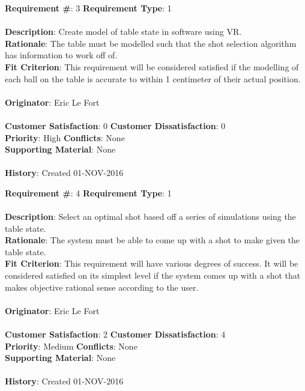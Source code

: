 \documentclass[titlepage]{article}
\begin{document}
\begin{framed}
	\noindent\textbf{Requirement \#}: 3 \hfill \textbf{Requirement Type}: 1 \hfill\\\\
	\noindent\textbf{Description}: Create model of table state in software using VR.\\
	\textbf{Rationale}: The table must be modelled such that the shot selection algorithm has information to work off of.\\
	\textbf{Fit Criterion}: This requirement will be considered satisfied if the modelling of each ball on the table is accurate to within 1 centimeter of their actual position.\\\\%
	\textbf{Originator}: Eric Le Fort\\\\
	\noindent\textbf{Customer Satisfaction}: 0 \hfill 	\textbf{Customer Dissatisfaction}: 0 \hfill\\
	\textbf{Priority}: High \hfill \textbf{Conflicts}: None \hfill\\
	\textbf{Supporting Material}: None\\\\
	\noindent\textbf{History}: Created 01-NOV-2016
\end{framed}

\begin{framed}
	\noindent\textbf{Requirement \#}: 4 \hfill \textbf{Requirement Type}: 1 \hfill\\\\
	\noindent\textbf{Description}: Select an optimal shot based off a series of simulations using the table state.\\
	\textbf{Rationale}: The system must be able to come up with a shot to make given the table state.\\
	\textbf{Fit Criterion}: This requirement will have various degrees of success. It will be considered satisfied on its simplest level if the system comes up with a shot that makes objective rational sense according to the user.\\\\
	\textbf{Originator}: Eric Le Fort\\\\
	\noindent\textbf{Customer Satisfaction}: 2 \hfill 	\textbf{Customer Dissatisfaction}: 4 \hfill\\
	\textbf{Priority}: Medium \hfill \textbf{Conflicts}: None \hfill\\
	\textbf{Supporting Material}: None\\\\
	\noindent\textbf{History}: Created 01-NOV-2016
\end{framed}
\end{document}
